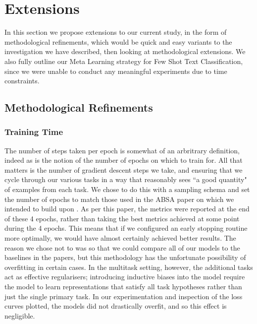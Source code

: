
\chapter{Extensions} \label{chapter:extensions}

In this section we propose extensions to our current study, in the form of methodological refinements, which would be quick and easy variants to the investigation we have described, then looking at methodological extensions. We also fully outline our Meta Learning strategy for Few Shot Text Classification, since we were unable to conduct any meaningful experiments due to time constraints.

\section{Methodological Refinements}

\subsection{Training Time} \label{section:extensions:numstepsperepoch}
The number of steps taken per epoch is somewhat of an arbritrary definition, indeed as is the notion of the number of epochs on which to train for. All that matters is the number of gradient descent steps we take, and ensuring that we cycle through our various tasks in a way that reasonably sees ``a good quantity" of examples from each task. We chose to do this with a sampling schema and set the number of epochs to match those used in the ABSA paper on which we intended to build upon \cite{Sun2019}. As per this paper, the metrics were reported at the end of these 4 epochs, rather than taking the best metrics achieved at some point during the 4 epochs. This means that if we configured an early stopping routine more optimally, we would have almost certainly achieved better results. The reason we chose not to was so that we could compare all of our models to the baselines in the papers, but this methodology has the unfortunate possibility of overfitting in certain cases. In the multitask setting, however, the additional tasks act as effective regularisers; introducing inductive biases into the model require the model to learn representations that satisfy all task hypotheses rather than just the single primary task. In our experimentation and inspection of the loss curves plotted, the models did not drastically overfit, and so this effect is negligible.

